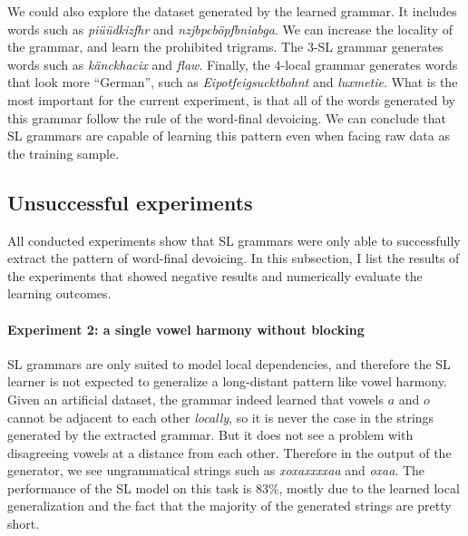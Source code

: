 We could also explore the dataset generated by the learned grammar.
It includes words such as \emph{pi\"u\"udkizfhr} and \emph{nzjbpcb\"opfbniabga}.
We can increase the locality of the grammar, and learn the prohibited trigrams.
The $3$-SL grammar generates words such as \emph{k\"anckhacix} and \emph{flaw}.
Finally, the $4$-local grammar generates words that look more ``German'', such as \emph{Eipotfeigsucktbohnt} and \emph{luxmetie}.
What is the most important for the current experiment, is that all of the words generated by this grammar follow the rule of the word-final devoicing.
We can conclude that SL grammars are capable of learning this pattern even when facing raw data as the training sample.



\subsection{Unsuccessful experiments}

All conducted experiments show that SL grammars were only able to successfully extract the pattern of word-final devoicing.
In this subsection, I list the results of the experiments that showed negative results and numerically evaluate the learning outcomes.


\paragraph{Experiment 2: a single vowel harmony without blocking}

SL grammars are only suited to model local dependencies, and therefore the SL learner is not expected to generalize a long-distant pattern like vowel harmony.
Given an artificial dataset, the grammar indeed learned that vowels $a$ and $o$ cannot be adjacent to each other \emph{locally}, so it is never the case in the strings generated by the extracted grammar.
But it does not see a problem with disagreeing vowels at a distance from each other.
Therefore in the output of the generator, we see ungrammatical strings such as \emph{xoxaxxxxaa} and \emph{oxaa}.
The performance of the SL model on this task is $83$\%, mostly due to the learned local generalization and the fact that the majority of the generated strings are pretty short.

